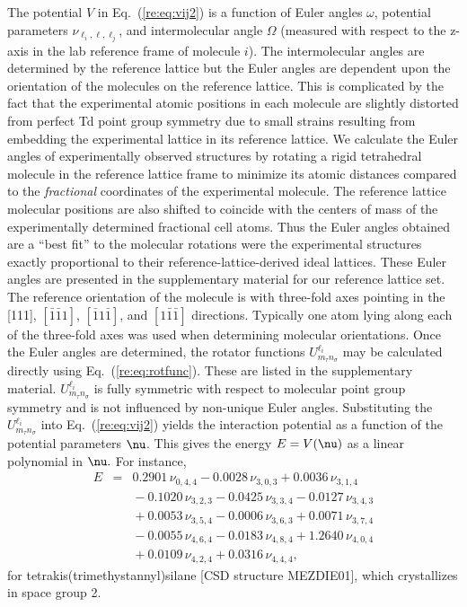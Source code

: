 \documentclass[preprint]{iucr}              %
\newcommand{\mb}[1]{\ensuremath{\mbox{\boldmath $ #1 $}}}
\begin{document}
The potential $V$ in Eq.\ (\ref{re:eq:vij2}) is a function of Euler
angles $\omega$, potential parameters $\nu_{\ell_i,\ell,\ell_j}$,
and intermolecular angle $\Omega$ (measured with respect to the
z-axis in the lab reference frame of molecule $i$). The
intermolecular angles are determined by the reference lattice but
the Euler angles are dependent upon the orientation of the molecules
on the reference lattice. This is complicated by the fact that the
experimental atomic positions in each molecule are slightly
distorted from perfect Td point group symmetry due to small strains resulting from embedding the
experimental lattice in its reference lattice. We calculate the
Euler angles of experimentally observed structures by rotating a
rigid tetrahedral molecule in the reference lattice frame to
minimize its atomic distances compared to the \emph{fractional}
coordinates of the experimental molecule. The reference lattice
molecular positions are also shifted to coincide with the centers of
mass of the experimentally determined fractional cell atoms. Thus
the Euler angles obtained are a ``best fit'' to the molecular
rotations were the experimental structures exactly proportional to
their reference-lattice-derived ideal lattices. These Euler angles
are presented in the supplementary material for our reference
lattice set. The reference orientation of the molecule is with
three-fold axes pointing in the [111], $[\bar{1}\bar{1}1]$,
$[\bar{1}1\bar{1}]$, and $[1\bar{1}\bar{1}]$ directions. Typically
one atom lying along each of the three-fold axes was used when
determining molecular orientations. Once the
Euler angles are determined, the rotator functions
$U^{\ell_i}_{m_\tau n_\sigma}$ may be calculated directly using
Eq.~(\ref{re:eq:rotfunc}). These are listed in the supplementary
material. $U^{\ell_i}_{m_\tau n_\sigma}$ is fully symmetric with
respect to molecular point group symmetry and is not influenced by non-unique
Euler angles. Substituting the $U^{\ell_i}_{m_\tau n_\sigma}$ into
Eq.~(\ref{re:eq:vij2}) yields the interaction potential as a function
of the potential parameters $\mb{\nu}$. This gives the energy
$E=V(\mb{\nu})$ as a linear polynomial in $\mb{\nu}.$   For instance,
\begin{eqnarray}
\label{energyOfStructure} E & = & 0.2901\,\nu_{0,4,4} -
0.0028\,\nu_{3,0,3} +
0.0036\,\nu_{3,1,4}  \nonumber \\
&&{}- 0.1020\,\nu_{3,2,3} - 0.0425\,\nu_{3,3,4} -0.0127\,\nu_{3,4,3}
 \nonumber \\
&&{}+ 0.0053\,\nu_{3,5,4} - 0.0006\,\nu_{3,6,3} +
0.0071\,\nu_{3,7,4}  \nonumber \\
&&{}- 0.0055\,\nu_{4,6,4} - 0.0183\,\nu_{4,8,4}+
1.2640\,\nu_{4,0,4}\nonumber\\
&&{}+ 0.0109\,\nu_{4,2,4} + 0.0316\,\nu_{4,4,4},
\end{eqnarray}
for tetrakis(trimethystannyl)silane  [CSD structure MEZDIE01], which
crystallizes in space group 2.
\end{document}
